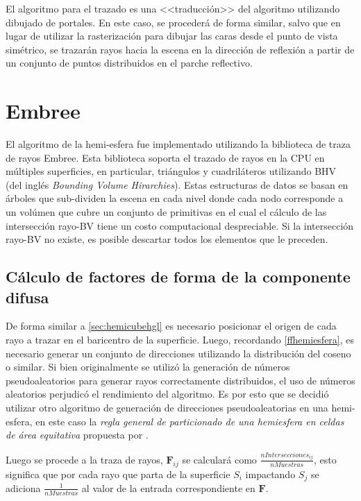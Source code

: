 El algoritmo para el trazado es una <<traducción>> del algoritmo utilizando dibujado de portales. En este caso, se procederá de forma similar, salvo que en lugar de utilizar la rasterización para dibujar las caras desde el punto de vista simétrico, se trazarán rayos hacia la escena en la dirección de reflexión a partir de un conjunto de puntos distribuidos en el parche reflectivo.

\section{Embree}
\label{sec:embree-impl}

El algoritmo de la hemi-esfera fue implementado utilizando la biblioteca de traza de rayos Embree. Esta biblioteca soporta el trazado de rayos en la CPU en múltiples superficies, en particular, triángulos y cuadriláteros utilizando BHV (del inglés \textit{Bounding Volume Hirarchies}). Estas estructuras de datos se basan en árboles que sub-dividen la escena en cada nivel donde cada nodo corresponde a un volúmen que cubre un conjunto de primitivas en el cual el cálculo de las intersección rayo-BV tiene un costo computacional despreciable. Si la intersección rayo-BV no existe, es posible descartar todos los elementos que le preceden.

\subsection{Cálculo de factores de forma de la componente difusa}

De forma similar a \ref{sec:hemicubehgl} es necesario posicionar el origen de cada rayo a trazar en el baricentro de la superficie. Luego, recordando \eqref{ffhemiesfera}, es necesario generar un conjunto de direcciones utilizando la distribución del coseno o similar. Si bien originalmente se utilizó la generación de números pseudoaleatorios para generar rayos correctamente distribuidos, el uso de números aleatorios perjudicó el rendimiento del algoritmo. Es por esto que se decidió utilizar otro algoritmo de generación de direcciones pseudoaleatorias en una hemi-esfera, en este caso la \textit{regla general de particionado de una hemiesfera en celdas de área equitativa} propuesta por \citeauthor{Becker}.


Luego se procede a la traza de rayos, $\mathbf{F}_{ij}$ se calculará como $\frac{nIntersecciones_{ij}}{nMuestras}$, esto significa que por cada rayo que parta de la superficie $S_{i}$ impactando $S_{j}$ se adiciona $\frac{1}{nMuestras}$ al valor de la entrada correspondiente en $\mathbf{F}$.

